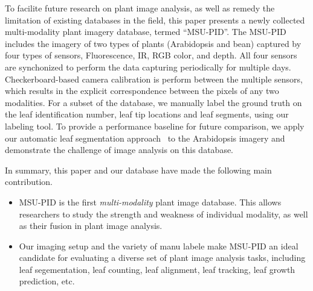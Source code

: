 To facilite future research on plant image analysis, as well as remedy the limitation of existing databases in the field, this paper presents a newly collected multi-modality plant imagery database, termed ``MSU-PID''.
The MSU-PID includes the imagery of two types of plants (Arabidopsis and bean) captured by four types of sensors, Fluorescence, IR, RGB color, and depth.
All four sensors are synchonized to perform the data capturing periodically for multiple days. 
Checkerboard-based camera calibration is perform between the multiple sensors, which results in the explicit correspondence between the pixels of any two modalities.
For a subset of the database, we manually label the ground truth on the leaf identification number, leaf tip locations and leaf segments, using our labeling tool.
To provide a performance baseline for future comparison, we apply our automatic leaf segmentation approach~\cite{yin2014a,yin2014b} to the Arabidopsis imagery and demonstrate the challenge of image analysis on this database. 
 
In summary, this paper and our database have made the following main contribution. 
\begin{itemize}
\item MSU-PID is the first {\it multi-modality} plant image database. 
This allows researchers to study the strength and weakness of individual modality, as well as their fusion in plant image analysis.
\item Our imaging setup and the variety of manu labele make MSU-PID an ideal candidate for evaluating a diverse set of plant image analysis tasks, including leaf segementation, leaf counting, leaf alignment, leaf tracking, leaf growth prediction, etc.
\end{itemize}



  